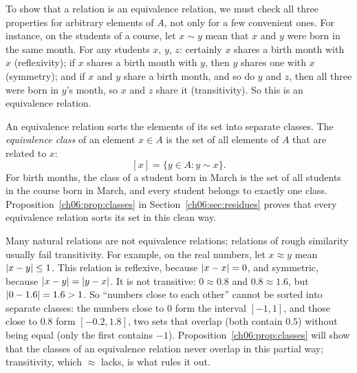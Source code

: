 To show that a relation is an equivalence relation, we must check all three properties for arbitrary elements of $A$, not only for a few convenient ones. For instance, on the students of a course, let $x\sim y$ mean that $x$ and $y$ were born in the same month. For any students $x$, $y$, $z$: certainly $x$ shares a birth month with $x$ (reflexivity); if $x$ shares a birth month with $y$, then $y$ shares one with $x$ (symmetry); and if $x$ and $y$ share a birth month, and so do $y$ and $z$, then all three were born in $y$'s month, so $x$ and $z$ share it (transitivity). So this is an equivalence relation.

An equivalence relation sorts the elements of its set into separate classes. The \emph{equivalence class} of an element $x\in A$ is the set of all elements of $A$ that are related to $x$:
\[
[x]=\{y\in A:y\sim x\}.
\]
For birth months, the class of a student born in March is the set of all students in the course born in March, and every student belongs to exactly one class. Proposition~\ref{ch06:prop:classes} in Section~\ref{ch06:sec:residues} proves that every equivalence relation sorts its set in this clean way.

Many natural relations are not equivalence relations; relations of rough similarity usually fail transitivity. For example, on the real numbers, let $x\approx y$ mean $\left|x-y\right|\le1$. This relation is reflexive, because $\left|x-x\right|=0$, and symmetric, because $\left|x-y\right|=\left|y-x\right|$. It is not transitive: $0\approx0.8$ and $0.8\approx1.6$, but $\left|0-1.6\right|=1.6>1$. So ``numbers close to each other'' cannot be sorted into separate classes: the numbers close to $0$ form the interval $[-1,1]$, and those close to $0.8$ form $[-0.2,1.8]$, two sets that overlap (both contain $0.5$) without being equal (only the first contains $-1$). Proposition~\ref{ch06:prop:classes} will show that the classes of an equivalence relation never overlap in this partial way; transitivity, which $\approx$ lacks, is what rules it out.

